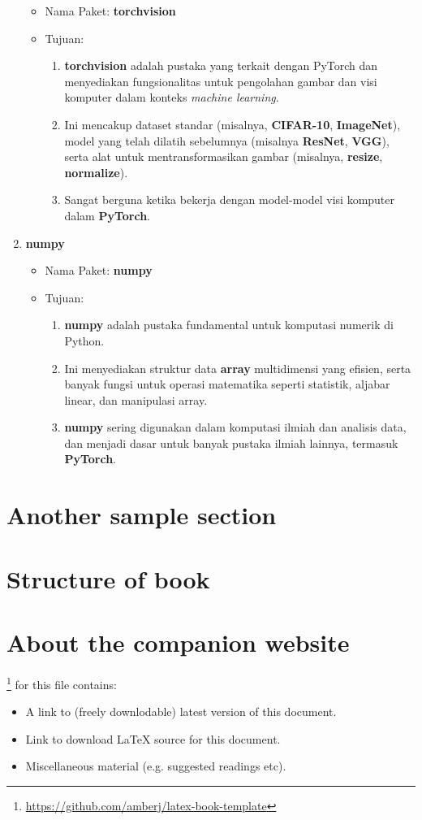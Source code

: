\documentclass[a4paper,11pt]{book}
\begin{document}
\begin{enumerate}
	\begin{itemize}
		\item Nama Paket: \textbf{torchvision}
		\item Tujuan:
		\begin{enumerate}
			\item \textbf{torchvision} adalah pustaka yang terkait dengan PyTorch dan menyediakan fungsionalitas untuk pengolahan gambar dan visi komputer dalam konteks \textit{machine learning}.
			\item Ini mencakup dataset standar (misalnya, \textbf{CIFAR-10}, \textbf{ImageNet}), model yang telah dilatih sebelumnya (misalnya \textbf{ResNet}, \textbf{VGG}), serta alat untuk mentransformasikan gambar (misalnya, \textbf{resize}, \textbf{normalize}).
			\item Sangat berguna ketika bekerja dengan model-model visi komputer dalam \textbf{PyTorch}.
		\end{enumerate}
	\end{itemize}
	\item \textbf{numpy}
	\begin{itemize}
		\item Nama Paket: \textbf{numpy}
		\item Tujuan:
		\begin{enumerate}
			\item \textbf{numpy} adalah pustaka fundamental untuk komputasi numerik di Python.
			\item Ini menyediakan struktur data \textbf{array} multidimensi yang efisien, serta banyak fungsi untuk operasi matematika seperti statistik, aljabar linear, dan manipulasi array.
			\item \textbf{numpy} sering digunakan dalam komputasi ilmiah dan analisis data, dan menjadi dasar untuk banyak pustaka ilmiah lainnya, termasuk \textbf{PyTorch}.
		\end{enumerate}
	\end{itemize}
\end{enumerate}

\section*{Another sample section}

\section*{Structure of book}

\section*{About the companion website}
\footnote{\url{https://github.com/amberj/latex-book-template}} for this file contains:
\begin{itemize}
  \item A link to (freely downlodable) latest version of this document.
  \item Link to download LaTeX source for this document.
  \item Miscellaneous material (e.g. suggested readings etc).
\end{itemize}
\end{document}
